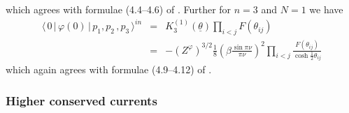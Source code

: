 \documentclass[a4paper,a4paper]{article}
\begin{document}
which agrees with formulae (4.4--4.6) of \cite{KW}. Further for $n=3$ and $%
N=1$ we have 
\begin{eqnarray*}
\langle \,0\,|\,\varphi (0)\,|\,p_{1},p_{2}\,,p_{3}\,\rangle ^{in}
&=&K_{3}^{(1)}(\underline{\theta })\prod_{i<j}F(\theta _{ij}) \\
&=&-\left( Z^{\varphi }\right) ^{3/2}\frac{1}{8}\left( \beta \frac{\sin \pi
\nu }{\pi \nu }\right) ^{2}\prod_{i<j}\frac{F(\theta _{ij})}{\cosh \frac{1}{2%
}\theta _{ij}}
\end{eqnarray*}
which again agrees with formulae (4.9--4.12) of \cite{KW}.

\subsubsection{Higher conserved currents}
\end{document}
